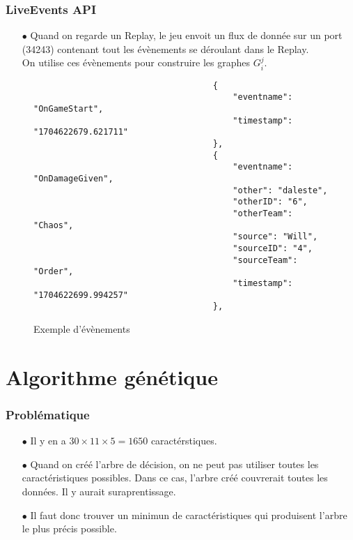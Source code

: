\documentclass{beamer}
\begin{document}
\begin{frame}[fragile]
    \frametitle{LiveEvents API}
    \begin{enumerate}
        \item[$\bullet$] Quand on regarde un Replay, le jeu envoit un flux de donnée sur un port (34243) contenant tout les évènements se déroulant dans le Replay. \\
        On utilise ces évènements pour construire les graphes $G_{i}^{j}$.
    \end{enumerate}
    \begin{figure}
        \centering
        \tiny
            \begin{verbatim}
                                    {
                                        "eventname": "OnGameStart",
                                        "timestamp": "1704622679.621711"
                                    },
                                    {
                                        "eventname": "OnDamageGiven",
                                        "other": "daleste",
                                        "otherID": "6",
                                        "otherTeam": "Chaos",
                                        "source": "Will",
                                        "sourceID": "4",
                                        "sourceTeam": "Order",
                                        "timestamp": "1704622699.994257"
                                    },
        \end{verbatim}
        \caption{Exemple d'évènements}
    \end{figure}
\end{frame}

\section{Algorithme génétique}

\begin{frame}
    \frametitle{Problématique}
    \begin{enumerate}
        \item[$\bullet$] Il y en a $30 \times 11 \times 5 = 1650$ caractérstiques.
        \item[$\bullet$] Quand on créé l'arbre de décision, on ne peut pas utiliser toutes les caractéristiques possibles. Dans ce cas, l'arbre créé couvrerait toutes les données. Il y aurait suraprentissage\cite{overfitting}.
        \item[$\bullet$] Il faut donc trouver un minimun de caractéristiques qui produisent l'arbre le plus précis possible.
    \end{enumerate}
\end{frame}
\end{document}
